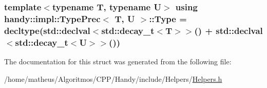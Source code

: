 \subsubsection[{\texorpdfstring{Type}{Type}}]{\setlength{\rightskip}{0pt plus 5cm}template$<$typename T, typename U$>$ using {\bf handy\+::impl\+::\+Type\+Prec}$<$ T, U $>$\+::{\bf Type} =  decltype({\bf std\+::declval}$<$std\+::decay\+\_\+t$<$T$>$$>$() + {\bf std\+::declval}$<$std\+::decay\+\_\+t$<$U$>$$>$())}\hypertarget{structhandy_1_1impl_1_1TypePrec_a583c07afc0afda9be823a137bc113020}{}\label{structhandy_1_1impl_1_1TypePrec_a583c07afc0afda9be823a137bc113020}


The documentation for this struct was generated from the following file\+:\begin{DoxyCompactItemize}
\item 
/home/matheus/\+Algoritmos/\+C\+P\+P/\+Handy/include/\+Helpers/\hyperlink{Helpers_2Helpers_8h}{Helpers.\+h}\end{DoxyCompactItemize}
